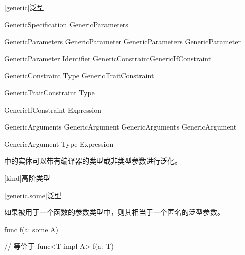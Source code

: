 
[generic]{泛型}

\begin{bnf}{GenericSpecification}
    \terminal{<} GenericParameters \terminal{>}
\end{bnf}

\begin{bnf}{GenericParameters}
    GenericParameter \br
    GenericParameters \terminal{,} GenericParameter
\end{bnf}

\begin{bnf}{GenericParameter}
    Identifier \bnfq GenericConstraint\bnfq GenericIfConstraint\bnfq
\end{bnf}

\begin{bnf}{GenericConstraint}
    \terminal{:}  \br
    \terminal{:} Type \br
    GenericTraitConstraint
\end{bnf}

\begin{bnf}{GenericTraitConstraint}
     Type
\end{bnf}

\begin{bnf}{GenericIfConstraint}
     Expression
\end{bnf}

\begin{bnf}{GenericArguments}
    GenericArgument \br
    GenericArguments \terminal{,} GenericArgument
\end{bnf}

\begin{bnf}{GenericArgument}
    Type \br
    Expression
\end{bnf}

\pnum
\X 中的实体可以带有编译器的类型或非类型参数进行泛化。

[kind]{高阶类型}

[generic.some]{泛型}

\pnum
如果被用于一个函数的参数类型中，则其相当于一个匿名的泛型参数。

\enterexample
\begin{codeblock}

func f(a: some A) { }

// 等价于
func<T impl A> f(a: T) { }

\end{codeblock}
\exitexample
